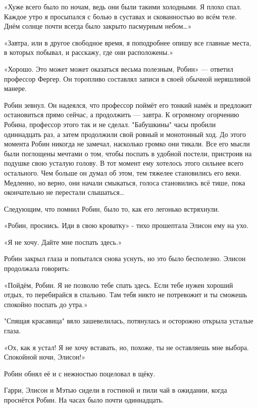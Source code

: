 \documentclass[a4paper,12pt]{book}
\begin{document}
\par
«Хуже всего было по ночам, ведь они были такими холодными. Я плохо спал. Каждое утро я просыпался с болью в суставах и скованностью во всём теле. Днём солнце почти всегда было закрыто пасмурным небом…»
\par
«Завтра, или в другое свободное время, я поподробнее опишу все главные места, в которых побывал, и расскажу, где они расположены.»
\par
«Хорошо. Это может может оказаться весьма полезным, Робин» — ответил профессор Фергер. Он торопливо составлял записи в своей обычной неряшливой манере.
\par
Робин зевнул. Он надеялся, что профессор поймёт его тонкий намёк и предложит остановиться прямо сейчас, а продолжить — завтра. К огромному огорчению Робина, профессор этого так и не сделал. "Бабушкины" часы пробили одиннадцать раз, а затем продолжили свой ровный и монотонный ход. До этого момента Робин никогда не замечал, насколько громко они тикали. Все его мысли были поглощены мечтами о том, чтобы поспать в удобной постели, пристроив на подушке свою усталую голову. В тот момент ему хотелось этого сильнее всего остального. Чем больше он думал об этом, тем тяжелее становились его веки. Медленно, но верно, они начали смыкаться, голоса становились всё тише, пока окончательно не перестали слышаться…
\par
Следующим, что помнил Робин, было то, как его легонько встряхнули.
\par
«Робин, проснись. Иди в свою кроватку» - тихо прошептала Элисон ему на ухо.
\par
«Я не хочу. Дайте мне поспать здесь.»
\par
Робин закрыл глаза и попытался снова уснуть, но это было бесполезно. Элисон продолжала говорить:
\par
«Пойдём, Робин. Я не позволю тебе спать здесь. Если тебе нужен хороший отдых, то перебирайся в спальню. Там тебя никто не потревожит и ты сможешь спокойно поспать до утра.»
\par
"Спящая красавица" вяло зашевелилась, потянулась и осторожно открыла усталые глаза.
\par
«Ох, как я устал! Я не хочу вставать, но, похоже, ты не оставляешь мне выбора. Спокойной ночи, Элисон!»
\par
Робин обнял её и с нежностью поцеловал в щёку.\\
\par
Гарри, Элисон и Мэтью сидели в гостиной и пили чай в ожидании, когда проснётся Робин. На часах было почти одиннадцать.
\end{document}
